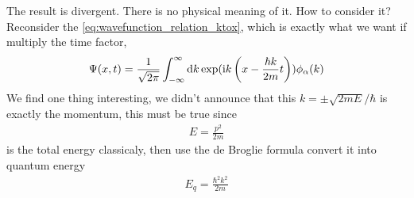 The result is divergent. There is no physical meaning of it. How to consider it? Reconsider the \cref{eq:wavefunction_relation_ktox}, which is exactly what we want if multiply the time factor,
\begin{eqnarray}
    \Psi(x,t) = \frac{1}{\sqrt{2 \pi}} \int_{- \infty}^{\infty} \mathrm{d} k \exp(\mathrm{i} k\left( x - \frac{\hbar k}{2m}t \right)) \phi_ \alpha(k)
\end{eqnarray}
We find one thing interesting, we didn't announce that this $ k = \pm \sqrt{2mE}/\hbar$ is exactly the momentum, this must be true since 
\begin{eqnarray}
    E = \frac{p^2}{2m}
\end{eqnarray}
is the total energy classicaly, then use the de Broglie formula convert it into quantum energy
\begin{eqnarray}
    E_q = \frac{\hbar^2 k^2}{2m}
\end{eqnarray}
